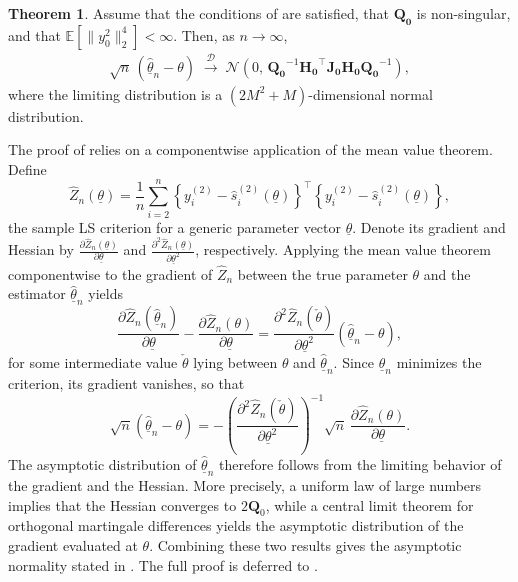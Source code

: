 \documentclass[12pt,a4paper]{article}
\theoremstyle{definition}
\newtheorem{theorem}{Theorem}[section]
\begin{document}
\begin{theorem}
\label{AsymptoticDistroFGARCH11estimator}
Assume that the conditions of  are satisfied, that $\mathbf{Q_0}$ is non-singular, and that $\mathbb{E}\!\left[\|y_0^2\|_2^4\right]<\infty$. Then, as $n\to\infty$,
\begin{gather}
\sqrt{n}\,(\underline{\hat{\theta}}_n-\theta)
\;\overset{\mathcal{D}}{\longrightarrow}\;
\mathcal{N}\!\left(0,\,
\mathbf{Q_0}^{-1}\mathbf{H_0}^\top\mathbf{J_0H_0Q_0}^{-1}\right),
\end{gather}
where the limiting distribution is a $(2M^2+M)$-dimensional normal distribution.
\end{theorem}

The proof of  relies on a componentwise application of the mean value theorem. Define
\[
\hat{Z}_n(\underline{\theta})
=
\frac{1}{n}\sum_{i=2}^n
\left\{ y_i^{(2)}-\hat{s}_i^{(2)}(\underline{\theta})\right\}^\top
\left\{ y_i^{(2)}-\hat{s}_i^{(2)}(\underline{\theta})\right\},
\]
the sample LS criterion for a generic parameter vector $\underline{\theta}$.
Denote its gradient and Hessian by
$\frac{\partial \hat{Z}_n(\underline{\theta})}{\partial\underline{\theta}}$
and
$\frac{\partial^2 \hat{Z}_n(\underline{\theta})}{\partial\underline{\theta}^2}$,
respectively.
Applying the mean value theorem componentwise to the gradient of $\hat{Z}_n$ between the true parameter $\theta$ and the estimator $\underline{\hat{\theta}}_n$ yields
\[
\frac{\partial \hat{Z}_n(\underline{\hat{\theta}}_n)}{\partial\underline{\theta}}
-
\frac{\partial \hat{Z}_n(\theta)}{\partial\underline{\theta}}
=
\frac{\partial^2 \hat{Z}_n(\check{\theta})}{\partial\underline{\theta}^2}
(\underline{\hat{\theta}}_n-\theta),
\]
for some intermediate value $\check{\theta}$ lying between $\theta$ and
$\underline{\hat{\theta}}_n$.
Since $\underline{\hat{\theta}}_n$ minimizes the criterion, its gradient vanishes, so that
\[
\sqrt{n}(\underline{\hat{\theta}}_n-\theta)
=
-
\left(\frac{\partial^2 \hat{Z}_n(\check{\theta})}{\partial\underline{\theta}^2}\right)^{-1}
\sqrt{n}\,
\frac{\partial \hat{Z}_n(\theta)}{\partial\underline{\theta}}.
\]
The asymptotic distribution of $\underline{\hat{\theta}}_n$ therefore follows from the limiting behavior of the gradient and the Hessian. More precisely, a uniform law of large numbers implies that the Hessian converges to $2\mathbf{Q}_0$, while a central limit theorem for orthogonal martingale differences yields the asymptotic distribution of the gradient evaluated at $\theta$. Combining these two results gives the asymptotic normality stated in . The full proof is deferred to .
\end{document}
